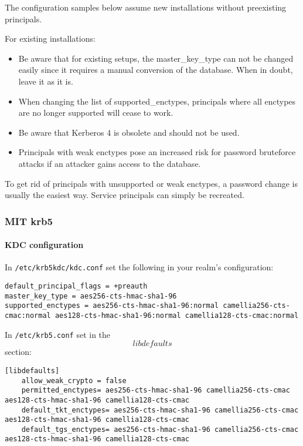 The configuration samples below assume new installations without preexisting principals.

For existing installations:
\begin{itemize}
	\item Be aware that for existing setups, the master\_key\_type can not be changed easily since it requires a manual conversion of the database. When in doubt, leave it as it is. 
	\item When changing the list of supported\_enctypes, principals where all enctypes are no longer supported will cease to work.
	\item Be aware that Kerberos 4 is obsolete and should not be used.
	\item Principals with weak enctypes pose an increased risk for password bruteforce attacks if an attacker gains access to the database.
\end{itemize}

To get rid of principals with unsupported or weak enctypes, a password change is usually the easiest way. Service principals can simply be recreated. 

\subsubsection{MIT krb5}

\paragraph{KDC configuration}
In \verb#/etc/krb5kdc/kdc.conf# set the following in your realm's configuration:
\begin{lstlisting}[breaklines]
default_principal_flags = +preauth
master_key_type = aes256-cts-hmac-sha1-96
supported_enctypes = aes256-cts-hmac-sha1-96:normal camellia256-cts-cmac:normal aes128-cts-hmac-sha1-96:normal camellia128-cts-cmac:normal
\end{lstlisting}

In \verb#/etc/krb5.conf# set in the \[libdefaults\] section:
\begin{lstlisting}[breaklines]
[libdefaults] 
	allow_weak_crypto = false
	permitted_enctypes= aes256-cts-hmac-sha1-96 camellia256-cts-cmac aes128-cts-hmac-sha1-96 camellia128-cts-cmac
	default_tkt_enctypes= aes256-cts-hmac-sha1-96 camellia256-cts-cmac aes128-cts-hmac-sha1-96 camellia128-cts-cmac
	default_tgs_enctypes= aes256-cts-hmac-sha1-96 camellia256-cts-cmac aes128-cts-hmac-sha1-96 camellia128-cts-cmac
\end{lstlisting}


